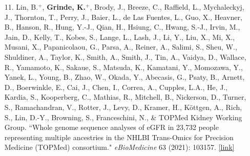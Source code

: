 \documentclass[margin]{res}
\newcommand{\annotateItem}[1]{
	\begin{itemize} \vspace{-0.1cm}
	\item[] 
	\begin{footnotesize}\textcolor{black}{(#1)}\end{footnotesize}
	\end{itemize} \vspace{-0.1cm}
}
\begin{document}
\begin{resume}
\begin{itemize}
\item[11.] Lin, B.$^{+}$, \textbf{Grinde, K.}$^{+}$, Brody, J., Breeze, C., Raffield, L., Mychaleckyj, J., Thornton, T., Perry, J., Baier, L., de Las Fuentes, L., Guo, X., Heavner, B., Hanson, R.,  Hung, Y.-J., Qian, H.,  Hsiung, C., Hwang, S.-J., Irvin, M., Jain, D., Kelly, T., Kobes, S.,  Lange, L., Lash, J.,  Li, Y.,  Liu, X.,  Mi, X., Musani, X., Papanicolaou, G., Parsa, A., Reiner, A., Salimi, S., Sheu, W., Shuldiner, A., Taylor, K., Smith, A., Smith, J., Tin, A., Vaidya, D., Wallace, R., Yamamoto, K., Sakaue, S., Matsuda, K.,  Kamatani, Y.,  Momozawa, Y., Yanek, L., Young, B.,  Zhao, W.,  Okada, Y.,  Abecasis, G., Psaty, B.,  Arnett, D.,  Boerwinkle, E.,  Cai, J., Chen, I., Correa, A., Cupples, L.A.,  He, J., Kardia, S.,  Kooperberg, C., Mathias, R., Mitchell, B., Nickerson, D., Turner, S., Ramachandran, V., Rotter, J., Levy, D.,  Kramer, H.,  Köttgen, A., Rich, S., Lin, D.-Y., Browning, S., Franceschini, N., \& TOPMed Kidney Working Group. ``Whole genome sequence analyses of eGFR in 23,732 people representing multiple ancestries in the NHLBI Trans-Omics for Precision Medicine (TOPMed) consortium." \textit{eBioMedicine} 63 (2021): 103157.
\href{https://www.thelancet.com/journals/ebiom/article/PIIS2352-3964(20)30533-8/fulltext}{[link]}


\end{itemize}
\end{resume}
\end{document}
